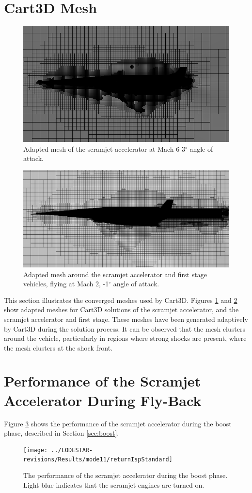 \section{Cart3D Mesh}
\begin{figure}[ht]
	\centering
	\includegraphics[width=0.7\linewidth]{figures/3_vehicle_design/M3AoA6GRID}
	\caption{Adapted mesh of the scramjet accelerator at Mach 6 3$^\circ$ angle of attack.}
	\label{fig:M3AoA6GRID}
\end{figure}

\begin{figure}[ht]
	\centering
	\includegraphics[width=0.7\linewidth]{figures/3_vehicle_design/CARTmesh}
	\caption{Adapted mesh around the scramjet accelerator and first stage vehicles, flying at Mach 2, -1$^\circ$ angle of attack.}
	\label{fig:CARTmesh}
\end{figure}
\noindent
This section illustrates the converged meshes used by Cart3D.
Figures \ref{fig:M3AoA6GRID} and \ref{fig:CARTmesh} show adapted meshes for Cart3D solutions of the scramjet accelerator, and the scramjet accelerator and first stage. These meshes have been generated adaptively by Cart3D during the solution process. It can be observed that the mesh clusters around the vehicle, particularly in regions where strong shocks are present, where the mesh clusters at the shock front. 
\FloatBarrier
\section{Performance of the Scramjet Accelerator During Fly-Back}
Figure \ref{fig:returnIspStandard} shows the performance of the scramjet accelerator during the boost phase, described in Section \ref{sec:boost}. 
\begin{figure}[ht]
	\centering
	\texttt{[image: ../LODESTAR-revisions/Results/mode11/returnIspStandard]}
	\caption{The performance of the scramjet accelerator during the boost phase. Light blue indicates that the scramjet engines are turned on.}
	\label{fig:returnIspStandard}
\end{figure}

